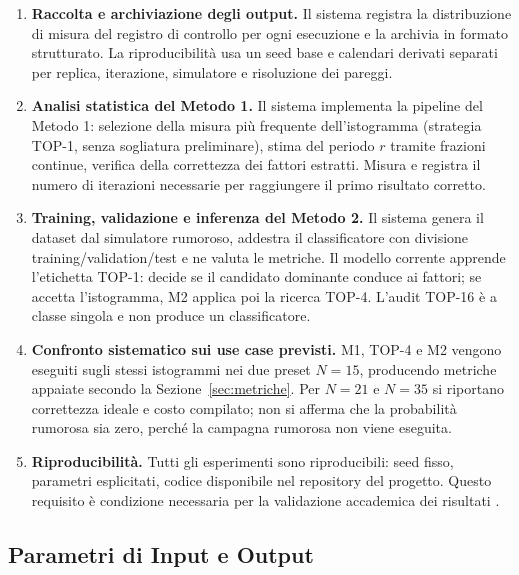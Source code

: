 \begin{onehalfspace}
\begin{enumerate}
    \item \textbf{Raccolta e archiviazione degli output.}
    Il sistema registra la distribuzione di misura del registro di controllo per ogni esecuzione e la archivia in formato strutturato. La riproducibilità usa un seed base e calendari derivati separati per replica, iterazione, simulatore e risoluzione dei pareggi.

    \item \textbf{Analisi statistica del Metodo 1.}
    Il sistema implementa la pipeline del Metodo 1: selezione della misura più frequente dell'istogramma (strategia TOP-1, senza sogliatura preliminare), stima del periodo $r$ tramite frazioni continue, verifica della correttezza dei fattori estratti. Misura e registra il numero di iterazioni necessarie per raggiungere il primo risultato corretto.

    \item \textbf{Training, validazione e inferenza del Metodo 2.}
    Il sistema genera il dataset dal simulatore rumoroso, addestra il classificatore con divisione training/validation/test e ne valuta le metriche. Il modello corrente apprende l'etichetta TOP-1: decide se il candidato dominante conduce ai fattori; se accetta l'istogramma, M2 applica poi la ricerca TOP-4. L'audit TOP-16 è a classe singola e non produce un classificatore.

    \item \textbf{Confronto sistematico sui use case previsti.}
    M1, TOP-4 e M2 vengono eseguiti sugli stessi istogrammi nei due preset $N=15$, producendo metriche appaiate secondo la Sezione~\ref{sec:metriche}. Per $N=21$ e $N=35$ si riportano correttezza ideale e costo compilato; non si afferma che la probabilità rumorosa sia zero, perché la campagna rumorosa non viene eseguita.

    \item \textbf{Riproducibilità.}
    Tutti gli esperimenti sono riproducibili: seed fisso, parametri esplicitati, codice disponibile nel repository del progetto. Questo requisito è condizione necessaria per la validazione accademica dei risultati \cite{shor_hpec2023}.

\end{enumerate}

\subsection{Parametri di Input e Output}
\label{sec:input_output}


\end{onehalfspace}
